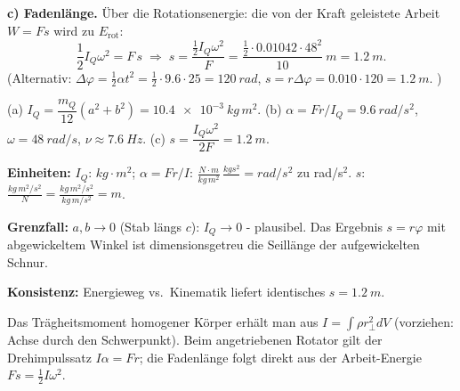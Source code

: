 \textbf{c) Fadenlänge.} Über die Rotationsenergie: die von der Kraft
geleistete Arbeit $W=F s$ wird zu $E_\mathrm{rot}$:
\begin{equation}
  \frac12 I_Q \omega^2 = F\,s
  \;\Rightarrow\;
  s = \frac{\frac12 I_Q\omega^2}{F}
  = \frac{\frac12\cdot 0.01042\cdot 48^2}{10}\ \si{m}
  = \qty{1.2}{m}.
\end{equation}
(Alternativ: $\Delta\varphi=\frac12\alpha t^2=\frac12\cdot9.6\cdot25=\qty{120}{rad}$,
$s=r\Delta\varphi=0.010\cdot120=\qty{1.2}{m}$. \checkmark)

\begin{ergebnis}
(a) $I_Q=\dfrac{m_Q}{12}(a^2+b^2)=\qty{10.4e-3}{kg\,m^2}$.
(b) $\alpha=F r/I_Q=\qty{9.6}{rad/s^2}$, $\omega=\qty{48}{rad/s}$,
$\nu\approx\qty{7.6}{Hz}$.
(c) $s=\dfrac{I_Q\omega^2}{2F}=\qty{1.2}{m}$.
\end{ergebnis}

\begin{kontrolle}
\textbf{Einheiten:} $I_Q$: $kg\cdot m^2$; $\alpha=F r/I$:
$\frac{N\cdot m}{kg\,m^2}\,\frac{kgs^2}{}=rad/s^2$ \checkmark zu rad/s$^2$.
$s$: $\frac{kg\,m^2/s^2}{N}=\frac{kg\,m^2/s^2}{kg\,m/s^2}=m$. \checkmark

\textbf{Grenzfall:} $a,b\to 0$ (Stab längs $c$): $I_Q\to0$ - plausibel. Das
Ergebnis $s=r\varphi$ mit abgewickeltem Winkel ist dimensionsgetreu die
Seillänge der aufgewickelten Schnur.

\textbf{Konsistenz:} Energieweg vs.\ Kinematik liefert identisches
$s=\qty{1.2}{m}$.
\end{kontrolle}

\begin{merksatz}
Das Trägheitsmoment homogener Körper erhält man aus $I=\int\rho r_\perp^2 dV$
(vorziehen: Achse durch den Schwerpunkt). Beim angetriebenen Rotator gilt
der Drehimpulssatz $I\alpha=F r$; die Fadenlänge folgt direkt aus der
Arbeit-Energie $Fs=\frac12 I\omega^2$.
\end{merksatz}